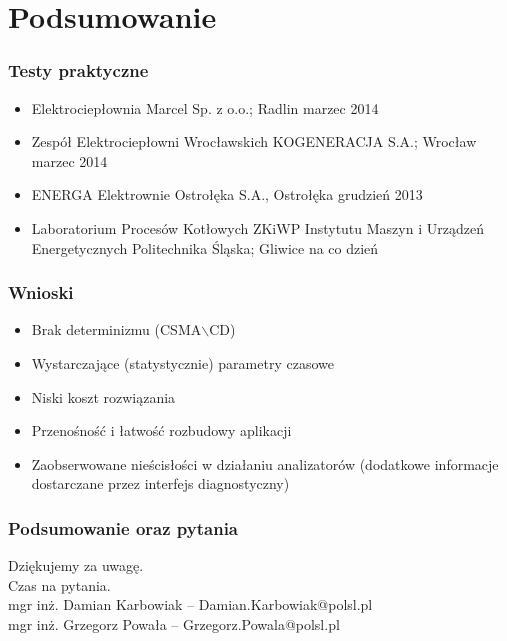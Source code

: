 \documentclass[ucs]{beamer}
\begin{document}
\section{Podsumowanie}
\begin{frame}
\frametitle{Testy praktyczne}
\begin{itemize}
\item Elektrociepłownia Marcel Sp. z o.o.; Radlin marzec 2014
\item Zespół Elektrociepłowni Wrocławskich KOGENERACJA S.A.; Wrocław marzec 2014
\item ENERGA Elektrownie Ostrołęka S.A., Ostrołęka grudzień 2013
\item Laboratorium Procesów Kotłowych ZKiWP Instytutu Maszyn i Urządzeń Energetycznych Politechnika Śląska; Gliwice na co dzień
\end{itemize}
\end{frame}

\begin{frame}
\frametitle{Wnioski}
\begin{itemize}
\setlength{\itemsep}{5pt}
\setlength{\parskip}{5pt}
\setlength{\parsep}{5pt}
\item Brak determinizmu (CSMA$\backslash$CD)
\item Wystarczające (statystycznie) parametry czasowe
\item Niski koszt rozwiązania
\item Przenośność i łatwość rozbudowy aplikacji
\item Zaobserwowane nieścisłości w działaniu analizatorów (dodatkowe informacje dostarczane przez interfejs diagnostyczny)
\end{itemize}
\end{frame}

\begin{frame}
\frametitle{Podsumowanie oraz pytania}
Dziękujemy za uwagę.
\\\vspace{2cm}
Czas na pytania.
\\\vspace{2cm}
mgr inż. Damian Karbowiak -- Damian.Karbowiak@polsl.pl\\
mgr inż. Grzegorz Powała  -- Grzegorz.Powala@polsl.pl
\end{frame}
\end{document}
